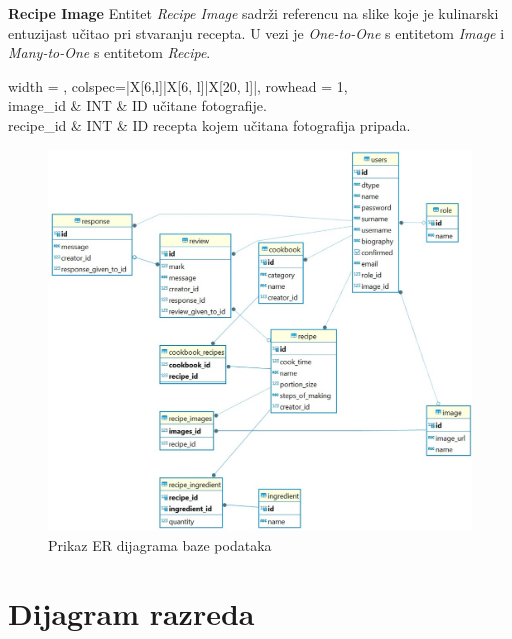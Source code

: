 				\textbf{Recipe Image} Entitet \textit{Recipe Image} sadrži referencu na slike koje je kulinarski entuzijast učitao pri stvaranju recepta. U vezi je \textit{One-to-One} s entitetom \textit{Image} i \textit{Many-to-One} s entitetom \textit{Recipe}.
				
				\begin{longtblr}[
					label=none,
					entry=none
					]{
						width = \textwidth,
						colspec={|X[6,l]|X[6, l]|X[20, l]|}, 
						rowhead = 1,
					} %
					\hline {}	 \\ \hline[3pt]
					image\_id & INT	&  ID učitane fotografije.  	\\ \hline
					recipe\_id & INT & ID recepta kojem učitana fotografija pripada. \\ \hline	
				\end{longtblr}
				
			\begin{figure}[H]
			\includegraphics[scale=0.4]{slike/er.PNG} %
			\centering
			\caption{Prikaz ER dijagrama baze podataka}
			\label{er}
		\end{figure}
				
				\eject	
	
	  \section{Dijagram razreda}
	  
